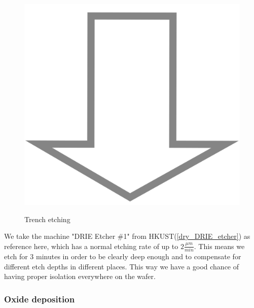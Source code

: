 \begin{figure}[H]
	\centering
	\begin{tikzpicture}[node distance = 3cm, auto, thick,scale=\CrossSectionOnly, every node/.style={transform shape}]
		
	\end{tikzpicture} \\
	\includegraphics[scale=0.01]{down_arrow.png} \\
	\begin{tikzpicture}[node distance = 3cm, auto, thick,scale=\CrossSectionOnly, every node/.style={transform shape}]
		
	\end{tikzpicture}
	\caption{Trench etching}
\end{figure}

We take the machine "DRIE Etcher \#1" from HKUST(\autoref{dry_DRIE_etcher}) as reference here, which has a normal etching rate of up to $2\frac{\mu m}{min}$.
This means we etch for 3 minutes in order to be clearly deep enough and to compensate for different etch depths in different places.
This way we have a good chance of having proper isolation everywhere on the wafer.

\newpage

\subsubsection{Oxide deposition}

